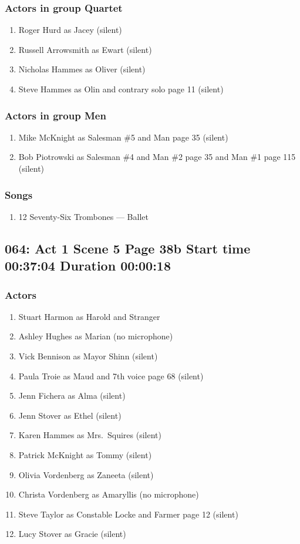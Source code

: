 \subsubsection{Actors in group Quartet}
\begin{enumerate}
\item Roger Hurd as Jacey (silent)
\item Russell Arrowsmith as Ewart (silent)
\item Nicholas Hammes as Oliver (silent)
\item Steve Hammes as Olin and contrary solo page 11 (silent)
\end{enumerate}
\subsubsection{Actors in group Men}
\begin{enumerate}
\item Mike McKnight as Salesman \#5 and Man page 35 (silent)
\item Bob Piotrowski as Salesman \#4 and Man \#2 page 35 and Man \#1 page 115 (silent)
\end{enumerate}

\subsubsection{Songs}
\begin{enumerate}
\item 12 Seventy-Six Trombones --- Ballet
\end{enumerate}
\subsection{064: Act 1 Scene 5 Page 38b Start time 00:37:04 Duration 00:00:18}

\subsubsection{Actors}
\begin{enumerate}
\item Stuart Harmon as Harold and Stranger
\item Ashley Hughes as Marian (no microphone)
\item Vick Bennison as Mayor Shinn (silent)
\item Paula Troie as Maud and 7th voice page 68 (silent)
\item Jenn Fichera as Alma (silent)
\item Jenn Stover as Ethel (silent)
\item Karen Hammes as Mrs.~Squires (silent)
\item Patrick McKnight as Tommy (silent)
\item Olivia Vordenberg as Zaneeta (silent)
\item Christa Vordenberg as Amaryllis (no microphone)
\item Steve Taylor as Constable Locke and Farmer page 12 (silent)
\item Lucy Stover as Gracie (silent)
\end{enumerate}
